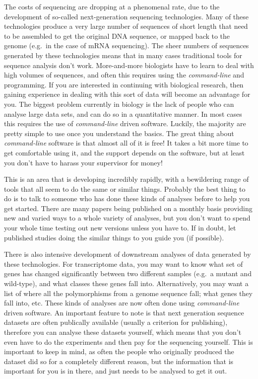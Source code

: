 \documentclass[]{article}
\begin{document}
The costs of sequencing are dropping at a phenomenal rate, due to the
development of so-called next-generation sequencing technologies. Many
of these technologies produce a very large number of sequences of short
length that need to be assembled to get the original DNA sequence, or
mapped back to the genome (e.g.~in the case of mRNA sequencing). The
sheer numbers of sequences generated by these technologies means that in
many cases traditional tools for sequence analysis don't work.
More-and-more biologists have to learn to deal with high volumes of
sequences, and often this requires using the \emph{command-line} and
programming. If you are interested in continuing with biological
research, then gaining experience in dealing with this sort of data will
become an advantage for you. The biggest problem currently in biology is
the lack of people who can analyse large data sets, and can do so in a
quantitative manner. In most cases this requires the use of
\emph{command-line} driven software. Luckily, the majority are pretty
simple to use once you understand the basics. The great thing about
\emph{command-line} software is that almost all of it is free! It takes
a bit more time to get comfortable using it, and the support depends on
the software, but at least you don't have to harass your supervisor for
money!

This is an area that is developing incredibly rapidly, with a
bewildering range of tools that all seem to do the same or similar
things. Probably the best thing to do is to talk to someone who has done
these kinds of analyses before to help you get started. There are many
papers being published on a monthly basis providing new and varied ways
to a whole variety of analyses, but you don't want to spend your whole
time testing out new versions unless you have to. If in doubt, let
published studies doing the similar things to you guide you (if
possible).

There is also intensive development of downstream analyses of data
generated by these technologies. For transcriptome data, you may want to
know what set of genes has changed significantly between two different
samples (e.g.~a mutant and wild-type), and what classes these genes fall
into. Alternatively, you may want a list of where all the polymorphisms
from a genome sequence fall; what genes they fall into, etc. These kinds
of analyses are now often done using \emph{command-line} driven
software. An important feature to note is that next generation sequence
datasets are often publically available (usually a criterion for
publishing), therefore you can analyse these datasets yourself, which
means that you don't even have to do the experiments and then pay for
the sequencing yourself. This is important to keep in mind, as often the
people who originally produced the dataset did so for a completely
different reason, but the information that is important for you is in
there, and just needs to be analysed to get it out.
\end{document}
